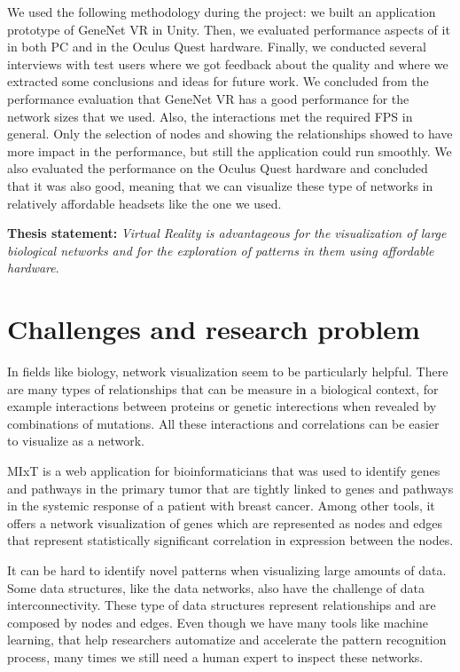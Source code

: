 We used the following methodology during the project: we built an application prototype of GeneNet VR in Unity. Then, we evaluated performance aspects of it in both PC and in the Oculus Quest hardware. Finally, we conducted several interviews with test users where we got feedback about the quality and where we extracted some conclusions and ideas for future work. We concluded from the performance evaluation that GeneNet VR has a good performance for the network sizes that we used. Also, the interactions met the required FPS in general. Only the selection of nodes and showing the relationships showed to have more impact in the performance, but still the application could run smoothly. We also evaluated the performance on the Oculus Quest hardware and concluded that it was also good, meaning that we can visualize these type of networks in relatively affordable headsets like the one we used.

\textbf{Thesis statement: } \emph{Virtual Reality is advantageous for the visualization of large biological networks and for the exploration of patterns in them using affordable hardware}.

\section{Challenges and research problem}

In fields like biology, network visualization seem to be particularly helpful\cite{pujana_network_modeling}\cite{fraser_view_function}. There are many types of relationships that can be measure in a biological context, for example interactions between proteins or genetic interections when revealed by combinations of mutations. All these interactions and correlations can be easier to visualize as a network\cite{merico_visualization}.

MIxT\cite{fjukstad_dumeaux_olsen_lund_hallett_bongo_2017} is a web application for bioinformaticians that was used to identify genes and pathways in the primary tumor that are tightly linked to genes and pathways in the systemic response of a patient with breast cancer\cite{dumeaux_fjukstad_interactions_tumor_blood}. Among other tools, it offers a network visualization of genes which are represented as nodes and edges that represent statistically significant correlation in expression between the nodes.

It can be hard to identify novel patterns when visualizing large amounts of data. Some data structures, like the data networks, also have the challenge of data interconnectivity. These type of data structures represent relationships and are composed by nodes and edges. Even though we have many tools like machine learning, that help researchers automatize and accelerate the pattern recognition process, many times we still need a human expert to inspect these networks\cite{network_expert}.

